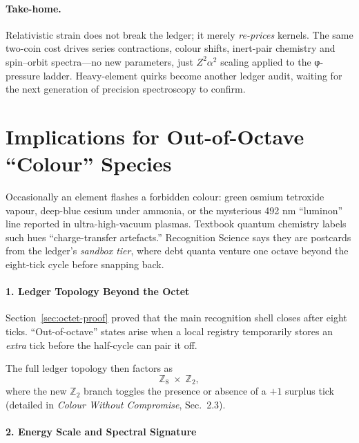 \documentclass[11pt,oneside]{book}
\begin{document}
\paragraph*{Take-home.}
Relativistic strain does not break the ledger; it merely
\emph{re-prices} kernels.  The same two-coin cost
drives series contractions, colour shifts, inert-pair chemistry and
spin–orbit spectra—no new parameters, just \(Z^{2}\alpha^{2}\) scaling
applied to the φ-pressure ladder.  
Heavy-element quirks become another ledger audit, waiting for the next
generation of precision spectroscopy to confirm.




















\section{Implications for Out-of-Octave “Colour” Species}
\label{sec:colour-implications}

Occasionally an element flashes a forbidden colour:  
green osmium tetroxide vapour, deep-blue cesium under ammonia, or the
mysterious 492 nm “luminon” line reported in ultra-high-vacuum plasmas.  
Textbook quantum chemistry labels such hues “charge-transfer artefacts.”  
Recognition Science says they are postcards from the ledger’s
\emph{sandbox tier}, where debt quanta venture one octave beyond the
eight-tick cycle before snapping back.

\paragraph*{1. Ledger Topology Beyond the Octet}

Section~\ref{sec:octet-proof} proved that the main
recognition shell closes after eight ticks.
“Out-of-octave” states arise when a local registry temporarily stores an
\emph{extra} tick before the half-cycle can pair it off.


The full ledger topology then factors as
\[
   \mathbb Z_8 \;\times\; \mathbb Z_2 ,
\]
where the new $\mathbb Z_2$ branch toggles the presence or absence of a
\(+1\) surplus tick (detailed in
\textit{Colour Without Compromise}, Sec.~2.3).

\paragraph*{2. Energy Scale and Spectral Signature}
\end{document}
